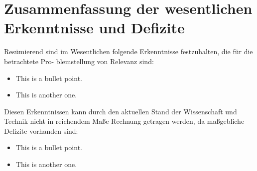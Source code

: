 \section{Zusammenfassung der wesentlichen Erkenntnisse und Defizite}



Resümierend sind im Wesentlichen folgende Erkenntnisse festzuhalten, die für die betrachtete Pro-
blemstellung von Relevanz sind:
\begin{itemize}
	\item This is a bullet point.
    \item This is another one.
\end{itemize}

Diesen Erkenntnissen kann durch den aktuellen Stand der Wissenschaft und Technik nicht in
reichendem Maße Rechnung getragen werden, da maßgebliche Defizite vorhanden sind:
\begin{itemize}
	\item This is a bullet point.
    \item This is another one.
\end{itemize}